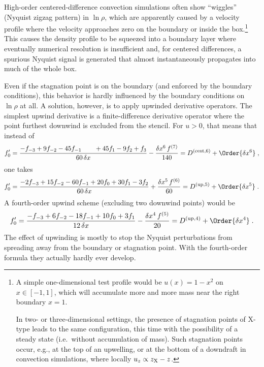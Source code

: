 \documentclass[\mydriver,12pt,twoside,notitlepage,a4paper]{article}
\begin{document}
High-order centered-difference convection simulations often show
``wiggles'' (Nyquist zigzag pattern) in $\ln\rho$, which are apparently
caused by a velocity profile where the velocity approaches zero on the
boundary or inside the box.\footnote{%
  A simple one-dimensional test profile would be $u(x) = 1-x^2$ on $x \in
  [-1,1]$, which will accumulate more and more mass near the right
  boundary $x=1$.

  In two- or three-dimensional settings, the presence of stagnation points
  of X-type leads to the same configuration, this time with the
  possibility of a steady state (i.e.~without accumulation of mass).
  Such stagnation points occur, e.g., at the top of an upwelling, or at
  the bottom of a downdraft in convection simulations, where locally
  $u_z \propto z_{\rm X}-z$.
}
This causes the density profile to be squeezed into a boundary layer where
eventually numerical resolution is insufficient and, for centered
differences, a spurious Nyquist signal is generated that almost
instantaneously propagates into much of the whole box.

Even if the stagnation point is on the boundary (and enforced by the
boundary conditions), this behavior is hardly influenced by the boundary
conditions on $\ln\rho$ at all.
A solution, however, is to apply upwinded derivative operators.
The simplest upwind derivative is a finite-difference derivative operator
where the point furthest downwind is excluded from the stencil.
For $u>0$, that means that instead of
\begin{equation}
  f'_0
  = \frac{-f_{-3} + 9 f_{-2} - 45 f_{-1} \qquad
           + 45 f_{1} - 9 f_{2} + f_{3}}
         {60\,\delta x}
    - \frac{\delta x^6\,f^{(7)}}{140}
  = D^{\rm(cent,6)} + \Order{\delta x^6} \; ,
\end{equation}
one takes
\begin{equation}
  f'_0
  = \frac{-2 f_{-3} + 15 f_{-2} - 60 f_{-1} + 20 f_{0} + 30 f_{1} - 3 f_{2}}
         {60\,\delta x}
    + \frac{\delta x^5\,f^{(6)}}{60}
  = D^{\rm(up,5)} + \Order{\delta x^5} \; .
\end{equation}
A fourth-order upwind scheme (excluding two downwind points) would be
\begin{equation}
  f'_0
  = \frac{-f_{-3} + 6 f_{-2} - 18 f_{-1} + 10 f_{0} + 3 f_{1}}
         {12\,\delta x}
    - \frac{\delta x^4\,f^{(5)}}{20}
  = D^{\rm(up,4)} + \Order{\delta x^4} \; .
\end{equation}
The effect of upwinding is mostly to stop the Nyquist perturbations from
spreading away from the boundary or stagnation point.
With the fourth-order formula they actually hardly ever develop.
\end{document}
